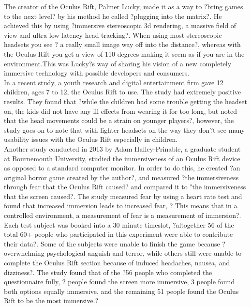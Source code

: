 \documentclass[a4paper]{article}
\begin{document}
\indent The creator of the Oculus Rift, Palmer Lucky, made it as a way to ?bring games to the next level? by his method he called ?plugging into the matrix?. He achieved this by using ?immersive stereoscopic 3d rendering, a massive field of view and ultra low latency head tracking?\cite{3}. When using most stereoscopic headsets you see ? a really small image way off into the distance?, whereas with the Oculus Rift you get a view of 110 degrees making it seem as if you are in the environment\cite{3}.This was Lucky?s way of sharing his vision of a new completely immersive technology with possible developers and consumers.\\
\indent In a recent study, a youth research and digital entertainment firm gave 12 children, ages 7 to 12, the Oculus Rift to use. The study had extremely positive results. They found that ?while the children had some trouble getting the headset on, the kids did not have any ill effects from wearing it for too long, but noted that the head movements could be a strain on younger players?\cite{4}, however, the study goes on to note that with lighter headsets on the way they don?t see many usability issues with the Oculus Rift especially in children.\\
\indent Another study conducted in 2013 by Adam Halley-Prinable, a graduate student at Bournemouth University, studied the immersiveness of an Oculus Rift device as opposed to a standard computer monitor. In order to do this, he created ?an original horror game created by the author?, and measured ?the immersiveness through fear that the Oculus Rift caused? and compared it to "the immersiveness that the screen caused?\cite{7}. The study measured fear by using a heart rate test and found that increased immersion leads to increased fear, ? This means that in a controlled environment, a measurement of fear is a measurement of immersion?\cite{7}. 
Each test subject was booked into a 30 minute timeslot, ?altogether 56 of the total 60+ people who participated in this experiment were able to contribute their data?\cite{7}. Some of the subjects were unable to finish the game because ?overwhelming psychological anguish and terror, while others still were unable to complete the Oculus Rift section because of induced headaches, nausea, and dizziness?\cite{7}. The study found that of the ?56 people who completed the questionnaire fully, 2 people found the screen more immersive, 3 people found both options equally immersive, and the remaining 51 people found the Oculus Rift to be the most immersive.?\cite{7}\\
\end{document}

